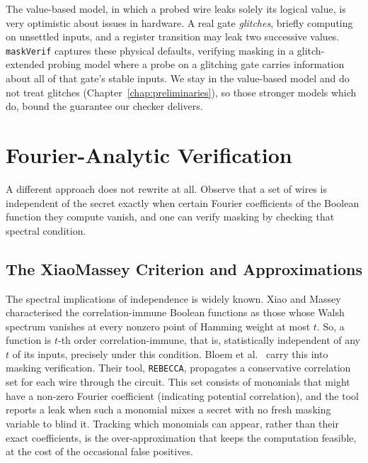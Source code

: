   The value-based model, in which a probed wire leaks solely its logical value, is
  very optimistic about issues in hardware. A real gate \emph{glitches}, briefly computing on unsettled
  inputs, and a register transition may leak two successive values.
  \texttt{maskVerif} \parencite{10.1007/978-3-030-29959-0_15} captures
  these physical defaults, verifying masking in a glitch-extended probing
  model where a probe on a glitching gate carries information about all of that gate's stable
  inputs.
  We stay in the value-based model and do not treat glitches
  (Chapter~\ref{chap:preliminaries}), so those stronger models which do, bound the guarantee
  our checker delivers.

\section{Fourier-Analytic Verification} %
\label{sec:fourier-analytic}

A different approach does not rewrite at all. Observe that a set of wires is
independent of the secret exactly when certain Fourier coefficients of the Boolean
function they compute vanish, and one can verify masking by checking that spectral
condition.

  \subsection{The Xiao\textendash Massey Criterion and Approximations}
  \label{sec:related-xiaomassey}

  The spectral implications of independence is widely known. Xiao and Massey
  \parencite{xiao1988spectral} characterised the correlation-immune Boolean
  functions as those whose Walsh spectrum vanishes at every nonzero point of
  Hamming weight at most $t$. So, a function is $t$-th order correlation-immune, that
  is, statistically independent of any $t$ of its inputs, precisely under this
  condition. Bloem et al.\ \parencite{bloem2018formal} carry this into masking
  verification. Their tool, \texttt{REBECCA}, propagates a conservative correlation set
  for each wire through the circuit. This set consists of monomials that might have a non-zero
  Fourier coefficient (indicating potential correlation), and the tool reports a
  leak when such a monomial mixes a secret with no fresh masking variable to blind it.
  Tracking which monomials can appear, rather than their exact coefficients, is the
  over-approximation that keeps the computation feasible, at the cost of the occasional
  false positives.


